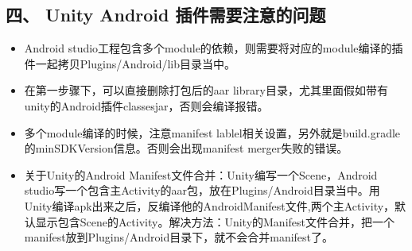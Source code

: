 \documentclass[9pt, b5paper]{article}
\begin{document}
\subsection{四、 Unity Android 插件需要注意的问题}
\label{sec-2-4}
\begin{itemize}
\item Android studio工程包含多个module的依赖，则需要将对应的module编译的插件一起拷贝Plugins/Android/lib目录当中。
\item 在第一步骤下，可以直接删除打包后的aar library目录，尤其里面假如带有unity的Android插件classesjar，否则会编译报错。
\item 多个module编译的时候，注意manifest lablel相关设置，另外就是build.gradle的minSDKVersion信息。否则会出现manifest merger失败的错误。
\item 关于Unity的Android Manifest文件合并：Unity编写一个Scene，Android studio写一个包含主Activity的aar包，放在Plugins/Android目录当中。用Unity编译apk出来之后，反编译他的AndroidManifest文件,两个主Activity，默认显示包含Scene的Activity。解决方法：Unity的Manifest文件合并，把一个manifest放到Plugins/Android目录下，就不会合并manifest了。
\end{itemize}
\end{document}
